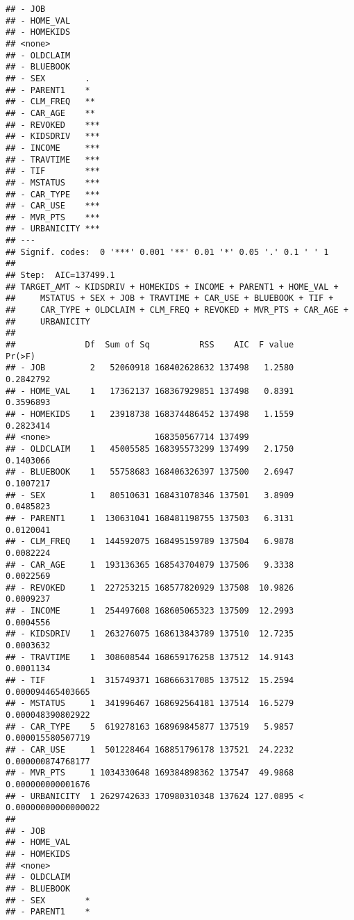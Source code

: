 \documentclass[
]{article}
\begin{document}
\begin{verbatim}
## - JOB           
## - HOME_VAL      
## - HOMEKIDS      
## <none>          
## - OLDCLAIM      
## - BLUEBOOK      
## - SEX        .  
## - PARENT1    *  
## - CLM_FREQ   ** 
## - CAR_AGE    ** 
## - REVOKED    ***
## - KIDSDRIV   ***
## - INCOME     ***
## - TRAVTIME   ***
## - TIF        ***
## - MSTATUS    ***
## - CAR_TYPE   ***
## - CAR_USE    ***
## - MVR_PTS    ***
## - URBANICITY ***
## ---
## Signif. codes:  0 '***' 0.001 '**' 0.01 '*' 0.05 '.' 0.1 ' ' 1
## 
## Step:  AIC=137499.1
## TARGET_AMT ~ KIDSDRIV + HOMEKIDS + INCOME + PARENT1 + HOME_VAL + 
##     MSTATUS + SEX + JOB + TRAVTIME + CAR_USE + BLUEBOOK + TIF + 
##     CAR_TYPE + OLDCLAIM + CLM_FREQ + REVOKED + MVR_PTS + CAR_AGE + 
##     URBANICITY
## 
##              Df  Sum of Sq          RSS    AIC  F value                Pr(>F)
## - JOB         2   52060918 168402628632 137498   1.2580             0.2842792
## - HOME_VAL    1   17362137 168367929851 137498   0.8391             0.3596893
## - HOMEKIDS    1   23918738 168374486452 137498   1.1559             0.2823414
## <none>                     168350567714 137499                               
## - OLDCLAIM    1   45005585 168395573299 137499   2.1750             0.1403066
## - BLUEBOOK    1   55758683 168406326397 137500   2.6947             0.1007217
## - SEX         1   80510631 168431078346 137501   3.8909             0.0485823
## - PARENT1     1  130631041 168481198755 137503   6.3131             0.0120041
## - CLM_FREQ    1  144592075 168495159789 137504   6.9878             0.0082224
## - CAR_AGE     1  193136365 168543704079 137506   9.3338             0.0022569
## - REVOKED     1  227253215 168577820929 137508  10.9826             0.0009237
## - INCOME      1  254497608 168605065323 137509  12.2993             0.0004556
## - KIDSDRIV    1  263276075 168613843789 137510  12.7235             0.0003632
## - TRAVTIME    1  308608544 168659176258 137512  14.9143             0.0001134
## - TIF         1  315749371 168666317085 137512  15.2594     0.000094465403665
## - MSTATUS     1  341996467 168692564181 137514  16.5279     0.000048390802922
## - CAR_TYPE    5  619278163 168969845877 137519   5.9857     0.000015580507719
## - CAR_USE     1  501228464 168851796178 137521  24.2232     0.000000874768177
## - MVR_PTS     1 1034330648 169384898362 137547  49.9868     0.000000000001676
## - URBANICITY  1 2629742633 170980310348 137624 127.0895 < 0.00000000000000022
##                 
## - JOB           
## - HOME_VAL      
## - HOMEKIDS      
## <none>          
## - OLDCLAIM      
## - BLUEBOOK      
## - SEX        *  
## - PARENT1    *  

\end{verbatim}
\end{document}

